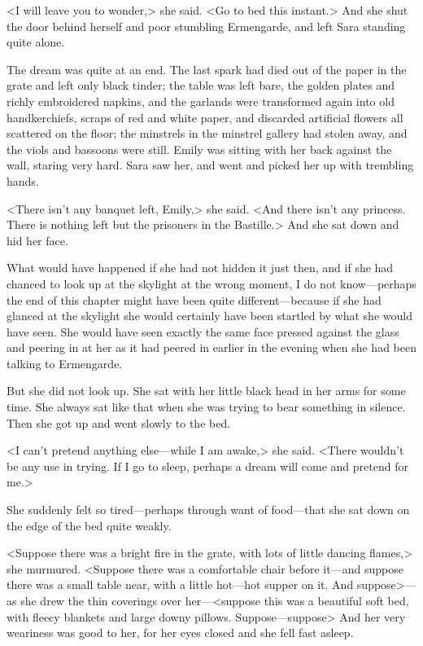 <I will leave you to wonder,> she said. <Go to bed this instant.> And she shut the door behind herself and poor stumbling Ermengarde, and left Sara standing quite alone.

The dream was quite at an end. The last spark had died out of the paper in the grate and left only black tinder; the table was left bare, the golden plates and richly embroidered napkins, and the garlands were transformed again into old handkerchiefs, scraps of red and white paper, and discarded artificial flowers all scattered on the floor; the minstrels in the minstrel gallery had stolen away, and the viols and bassoons were still. Emily was sitting with her back against the wall, staring very hard. Sara saw her, and went and picked her up with trembling hands.

<There isn't any banquet left, Emily,> she said. <And there isn't any princess. There is nothing left but the prisoners in the Bastille.> And she sat down and hid her face.

What would have happened if she had not hidden it just then, and if she had chanced to look up at the skylight at the wrong moment, I do not know—perhaps the end of this chapter might have been quite different—because if she had glanced at the skylight she would certainly have been startled by what she would have seen. She would have seen exactly the same face pressed against the glass and peering in at her as it had peered in earlier in the evening when she had been talking to Ermengarde.

But she did not look up. She sat with her little black head in her arms for some time. She always sat like that when she was trying to bear something in silence. Then she got up and went slowly to the bed.

<I can't pretend anything else—while I am awake,> she said. <There wouldn't be any use in trying. If I go to sleep, perhaps a dream will come and pretend for me.>

She suddenly felt so tired—perhaps through want of food—that she sat down on the edge of the bed quite weakly.

<Suppose there was a bright fire in the grate, with lots of little dancing flames,> she murmured. <Suppose there was a comfortable chair before it—and suppose there was a small table near, with a little hot—hot supper on it. And suppose>—as she drew the thin coverings over her—<suppose this was a beautiful soft bed, with fleecy blankets and large downy pillows. Suppose—suppose\longdash> And her very weariness was good to her, for her eyes closed and she fell fast asleep.


